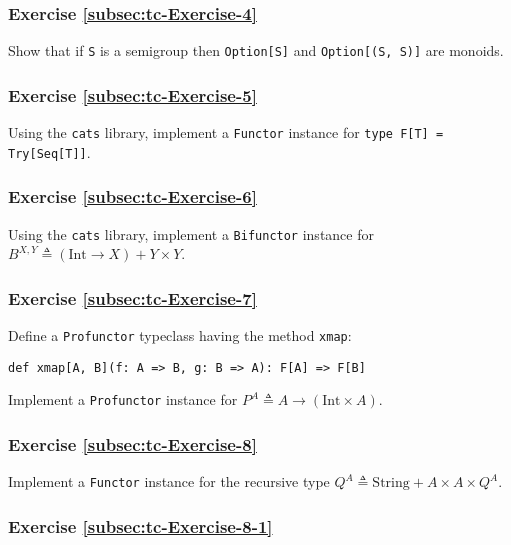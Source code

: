 \subsubsection{Exercise \label{subsec:tc-Exercise-4}\ref{subsec:tc-Exercise-4}}

Show that if \lstinline!S! is a semigroup then \lstinline!Option[S]!
and \lstinline!Option[(S, S)]! are monoids.

\subsubsection{Exercise \label{subsec:tc-Exercise-5}\ref{subsec:tc-Exercise-5}}

Using the \texttt{cats} library, implement a \lstinline!Functor!
instance for \lstinline!type F[T] = Try[Seq[T]]!.

\subsubsection{Exercise \label{subsec:tc-Exercise-6}\ref{subsec:tc-Exercise-6}}

Using the \texttt{cats} library, implement a \lstinline!Bifunctor!
instance for $B^{X,Y}\triangleq\left(\text{Int}\rightarrow X\right)+Y\times Y$.

\subsubsection{Exercise \label{subsec:tc-Exercise-7}\ref{subsec:tc-Exercise-7}}

Define a \lstinline!Profunctor! typeclass having the method \lstinline!xmap!:

\begin{lstlisting}
def xmap[A, B](f: A => B, g: B => A): F[A] => F[B]
\end{lstlisting}
Implement a \lstinline!Profunctor! instance for $P^{A}\triangleq A\rightarrow\left(\text{Int}\times A\right)$.

\subsubsection{Exercise \label{subsec:tc-Exercise-8}\ref{subsec:tc-Exercise-8}}

Implement a \lstinline!Functor! instance for the recursive type $Q^{A}\triangleq\text{String}+A\times A\times Q^{A}$.

\subsubsection{Exercise \label{subsec:tc-Exercise-8-1}\ref{subsec:tc-Exercise-8-1}}

